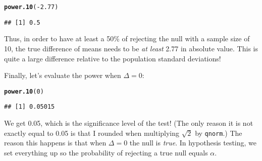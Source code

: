 \documentclass[addpoints,12pt]{exam}\usepackage[]{graphicx}\usepackage[]{color}
\makeatletter
\newcommand{\hlnum}[1]{\textcolor[rgb]{0.686,0.059,0.569}{#1}}%
\newcommand{\hlopt}[1]{\textcolor[rgb]{0,0,0}{#1}}%
\newcommand{\hlstd}[1]{\textcolor[rgb]{0.345,0.345,0.345}{#1}}%
\newcommand{\hlkwd}[1]{\textcolor[rgb]{0.737,0.353,0.396}{\textbf{#1}}}%
\newenvironment{kframe}{%
 \def\at@end@of@kframe{}%
 \ifinner\ifhmode%
  \def\at@end@of@kframe{\end{minipage}}%
  \begin{minipage}{\columnwidth}%
 \fi\fi%
 \def\FrameCommand##1{\hskip\@totalleftmargin \hskip-\fboxsep
 \colorbox{shadecolor}{##1}\hskip-\fboxsep
     \hskip-\linewidth \hskip-\@totalleftmargin \hskip\columnwidth}%
 \MakeFramed {\advance\hsize-\width
   \@totalleftmargin\z@ \linewidth\hsize
   \@setminipage}}%
 {\par\unskip\endMakeFramed%
 \at@end@of@kframe}
\newenvironment{knitrout}{}{} %
\makeatother
\begin{document}
\begin{questions}
\begin{parts}
\begin{solution}
\begin{knitrout}
\color{fgcolor}\begin{kframe}
\begin{alltt}
\hlkwd{power.10}\hlstd{(}\hlopt{-}\hlnum{2.77}\hlstd{)}
\end{alltt}
\begin{verbatim}
## [1] 0.5
\end{verbatim}
\end{kframe}
\end{knitrout}
Thus, in order to have at least a 50\% of rejecting the null with a sample size of 10, the true difference of means needs to be \emph{at least} 2.77 in absolute value. This is quite a large difference relative to the population standard deviations!

Finally, let's evaluate the power when $\Delta = 0$:
\begin{knitrout}
\color{fgcolor}\begin{kframe}
\begin{alltt}
\hlkwd{power.10}\hlstd{(}\hlnum{0}\hlstd{)}
\end{alltt}
\begin{verbatim}
## [1] 0.05015
\end{verbatim}
\end{kframe}
\end{knitrout}
We get 0.05, which is the significance level of the test! (The only reason it is not exactly equal to 0.05 is that I rounded when multiplying $\sqrt{2}$ by \texttt{qnorm}.) The reason this happens is that when $\Delta = 0$ the null is \emph{true}. In hypothesis testing, we set everything up so the probability of rejecting a true null equals $\alpha$.
      \end{solution}

\end{parts}
\end{questions}
\end{document}
